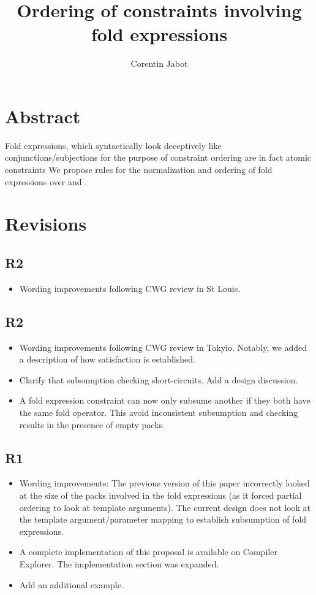 \documentclass{wg21}
\title{Ordering of constraints involving fold expressions}
\author{Corentin Jabot}{corentin.jabot@gmail.com}
\begin{document}
\maketitle

\section{Abstract}

Fold expressions, which syntactically look deceptively like conjunctions/subjections for the purpose of constraint ordering are in fact atomic constraints
We propose rules for the normalization and ordering of fold expressions over \tcode{\&\&} and \tcode{||}.

\section{Revisions}

\subsection{R2}

\begin{itemize}
	\item Wording improvements following CWG review in St Louis.
\end{itemize}
\subsection{R2}

\begin{itemize}
\item Wording improvements following CWG review in Tokyio. Notably, we added a description of how satisfaction is established.
\item Clarify that subsumption checking short-circuits. Add a design discussion.
\item A fold expression constraint can now only subsume another if they both have the same fold operator. This avoid inconsistent subsumption and checking results in the presence of empty packs.
\end{itemize}


\subsection{R1}

\begin{itemize}
\item Wording improvements: The previous version of this paper incorrectly looked at the size of the packs involved in the fold expressions (as it forced partial ordering to look at template arguments).
The current design does not look at the template argument/parameter mapping to establish subsumption of fold expressions.
\item A complete implementation of this proposal is available on Compiler Explorer. The implementation section was expanded.
\item Add an additional example.
\end{itemize}
\end{document}
